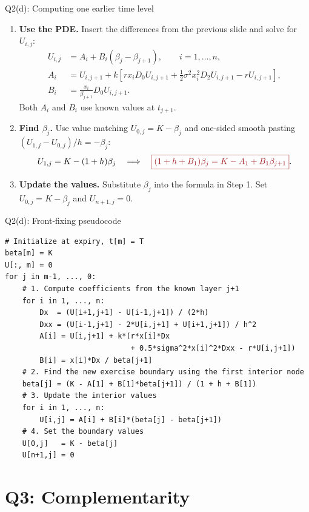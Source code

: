 \documentclass{beamer}
\newcommand{\keymath}[1]{\textcolor{lecturekey}{#1}}
\newcommand{\keybox}[1]{\keymath{\boxed{#1}}}
\begin{document}
\begin{frame}{Q2(d): Computing one earlier time level}
\footnotesize
\begin{enumerate}
\item \textbf{Use the PDE.} Insert the differences from the previous slide
and solve for $U_{i,j}$:
\begin{align*}
U_{i,j}&=A_i+B_i(\beta_j-\beta_{j+1}),\qquad i=1,\ldots,n,\\
A_i&=U_{i,j+1}+k\left[rx_iD_0U_{i,j+1}
+\tfrac12\sigma^2x_i^2D_2U_{i,j+1}-rU_{i,j+1}\right],\\
B_i&=\frac{x_i}{\beta_{j+1}}D_0U_{i,j+1}.
\end{align*}
Both $A_i$ and $B_i$ use known values at $t_{j+1}$.
\item \textbf{Find $\beta_j$.} Use value matching $U_{0,j}=K-\beta_j$
and one-sided smooth pasting $(U_{1,j}-U_{0,j})/h=-\beta_j$:
\[
U_{1,j}=K-(1+h)\beta_j
\quad\Longrightarrow\quad
\keybox{(1+h+B_1)\beta_j=K-A_1+B_1\beta_{j+1}}.
\]
\item \textbf{Update the values.} Substitute $\beta_j$ into the formula
in Step 1. Set $U_{0,j}=K-\beta_j$ and $U_{n+1,j}=0$.
\end{enumerate}
\end{frame}

\begin{frame}[fragile]{Q2(d): Front-fixing pseudocode}
\begin{lstlisting}[commentstyle=\color{codeblue}]
# Initialize at expiry, t[m] = T
beta[m] = K
U[:, m] = 0
for j in m-1, ..., 0:
    # 1. Compute coefficients from the known layer j+1
    for i in 1, ..., n:
        Dx  = (U[i+1,j+1] - U[i-1,j+1]) / (2*h)
        Dxx = (U[i-1,j+1] - 2*U[i,j+1] + U[i+1,j+1]) / h^2
        A[i] = U[i,j+1] + k*(r*x[i]*Dx
                             + 0.5*sigma^2*x[i]^2*Dxx - r*U[i,j+1])
        B[i] = x[i]*Dx / beta[j+1]
    # 2. Find the new exercise boundary using the first interior node
    beta[j] = (K - A[1] + B[1]*beta[j+1]) / (1 + h + B[1])
    # 3. Update the interior values
    for i in 1, ..., n:
        U[i,j] = A[i] + B[i]*(beta[j] - beta[j+1])
    # 4. Set the boundary values
    U[0,j]   = K - beta[j]
    U[n+1,j] = 0
\end{lstlisting}
\end{frame}

\section{Q3: Complementarity}
\end{document}
